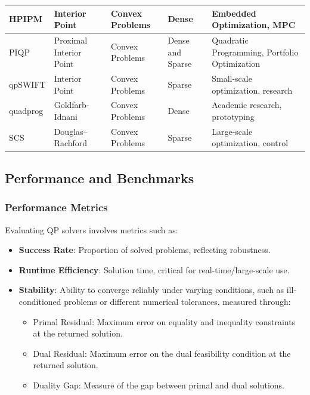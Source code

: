 \documentclass{article}
\begin{document}
\begin{table}[ht]
\begin{adjustbox}{max width=\textwidth}
\begin{tabular}{|l|l|l|l|l|}
HPIPM           & Interior Point              & Convex Problems                 & Dense                    & Embedded Optimization, MPC           \\ \hline
PIQP            & Proximal Interior Point     & Convex Problems                 & Dense and Sparse         & Quadratic Programming, Portfolio Optimization \\ \hline
qpSWIFT         & Interior Point              & Convex Problems                 & Sparse                   & Small-scale optimization, research   \\ \hline
quadprog        & Goldfarb-Idnani             & Convex Problems                 & Dense                    & Academic research, prototyping       \\ \hline
SCS             & Douglas–Rachford            & Convex Problems                 & Sparse                   & Large-scale optimization, control    \\ \hline
\end{tabular}
\end{adjustbox}
\label{tab:solver-characteristics}
\end{table}

\subsection{Performance and Benchmarks}

\subsubsection{Performance Metrics}
Evaluating QP solvers involves metrics such as:
\begin{itemize}
    \item \textbf{Success Rate}: Proportion of solved problems, reflecting robustness.
    \item \textbf{Runtime Efficiency}: Solution time, critical for real-time/large-scale use.
    \item \textbf{Stability}: Ability to converge reliably under varying conditions, such as ill-conditioned problems or different numerical tolerances, measured through:

    \begin{itemize}
        \item \textup{Primal Residual}: Maximum error on equality and inequality constraints at the returned solution.
        \item \textup{Dual Residual}: Maximum error on the dual feasibility condition at the returned solution.
        \item \textup{Duality Gap}: Measure of the gap between primal and dual solutions.
    \end{itemize}
\end{itemize}
\end{document}
